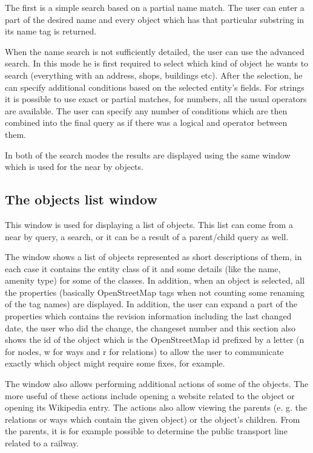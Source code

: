 \documentclass[nolof,digital]{fithesis3}
\begin{document}
The first is a simple search based on a partial name match. The user can enter a part of the desired name and every object which has that particular substring in its name tag is returned.

When the name search is not sufficiently detailed, the user can use the advanced search. In this mode he is first required to select which kind of object he wants to search (everything with an address, shops, buildings etc). After the selection, he can specify additional conditions based on the selected entity's fields. For strings it is possible to use exact or partial matches, for numbers, all the usual operators are available. The user can specify any number of conditions which are then combined into the final query as if there was a logical and operator between them.

In both of the search modes the results are displayed using the same window which is used for the near by objects.
\subsection{The objects list window}
This window is used for displaying a list of objects. This list can come from a near by query, a search, or it can be a result of a parent/child query as well.

The window shows a list of objects represented as short descriptions of them, in each case it contains the entity class of it and some details (like the name, amenity type) for some of the classes. In addition, when an object is selected, all the properties (basically OpenStreetMap tags when not counting some renaming of the tag names) are displayed. In addition, the user can expand a part of the properties which contains the revision information including the last changed date, the user who did the change, the changeset number and this section also shows the id of the object which is the OpenStreetMap id prefixed by a letter (n for nodes, w for ways and r for relations) to allow the user to communicate exactly which object might require some fixes, for example.

The window also allows performing additional actions of some of the objects. The more useful of these actions include opening a website related to the object or opening its Wikipedia entry. The actions also allow viewing the parents (e. g. the relations or ways which contain the given object) or the object's children. From the parents, it is for example possible to determine the public transport line related to a railway.
\end{document}
